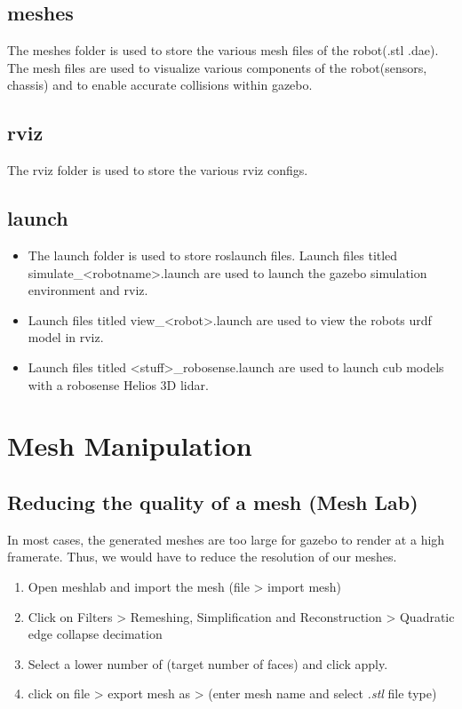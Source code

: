 \documentclass[11pt]{article}
\begin{document}
\subsection{meshes}
The meshes folder is used to store the various mesh files of the robot(.stl .dae).
The mesh files are used to visualize various components of the robot(sensors, chassis) and to enable accurate collisions within gazebo.

\subsection{rviz}
The rviz folder is used to store the various rviz configs.

\subsection{launch}
\begin{itemize}
 \item{

       The launch folder is used to store roslaunch files. Launch files titled simulate\_<robotname>.launch are used to launch the gazebo simulation environment and rviz.
       }
 \item{
       Launch files titled view\_<robot>.launch are used to view the robots urdf model in rviz.
       }
 \item{
       Launch files titled <stuff>\_robosense.launch are used to launch cub models with a robosense Helios 3D lidar.
       }
\end{itemize}



\section{Mesh Manipulation}
\subsection{Reducing the quality of a mesh (Mesh Lab)}
In most cases, the generated meshes are too large for gazebo to render at a high framerate. Thus, we would have to reduce the resolution of our meshes.
\begin{enumerate}
 \item {
       Open meshlab and import the mesh (file > import mesh)
       }
 \item{
       Click on Filters > Remeshing, Simplification and Reconstruction >  Quadratic edge collapse decimation
       }
 \item{
       Select a lower number of (target number of faces) and click apply.
       }
 \item{
       click on file > export mesh as > (enter mesh name and select \emph{.stl} file type)
       }
\end{enumerate}
\end{document}
